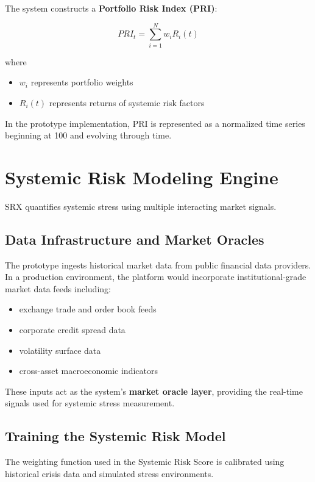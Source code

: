 \documentclass[11pt]{article}
\begin{document}
The system constructs a \textbf{Portfolio Risk Index (PRI)}:

\[
PRI_t = \sum_{i=1}^{N} w_i R_i(t)
\]

where

\begin{itemize}
\item $w_i$ represents portfolio weights
\item $R_i(t)$ represents returns of systemic risk factors
\end{itemize}

In the prototype implementation, PRI is represented as a normalized time series beginning at 100 and evolving through time.

\section{Systemic Risk Modeling Engine}

SRX quantifies systemic stress using multiple interacting market signals.

\subsection{Data Infrastructure and Market Oracles}

The prototype ingests historical market data from public financial data providers. In a production environment, the platform would incorporate institutional-grade market data feeds including:

\begin{itemize}
\item exchange trade and order book feeds
\item corporate credit spread data
\item volatility surface data
\item cross-asset macroeconomic indicators
\end{itemize}

These inputs act as the system's \textbf{market oracle layer}, providing the real-time signals used for systemic stress measurement.

\subsection{Training the Systemic Risk Model}

The weighting function used in the Systemic Risk Score is calibrated using historical crisis data and simulated stress environments.
\end{document}
